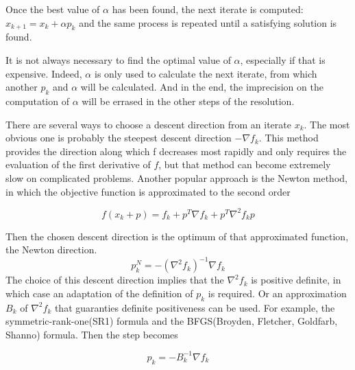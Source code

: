 Once the best value of $\alpha$ has been found, the next iterate is computed:
$x_{k+1} = x_{k} + \alpha p_k$ and the same process is repeated until a
satisfying solution is found. 

It is not always necessary to find the optimal value of $\alpha$, especially if
that is expensive. Indeed, $\alpha$ is only used to calculate the next iterate,
from which another $p_k$ and $\alpha$ will be calculated. And in the end, the
imprecision on the computation of $\alpha$ will be errased in the other steps of
the resolution.

There are several ways to choose a descent direction from an iterate $x_k$. The
most obvious one is probably the steepest descent direction $-\nabla f_k$. This
method provides the direction along which f decreases most rapidly and only
requires the evaluation of the first derivative of $f$, but that method can
become extremely slow on complicated problems. Another popular approach is the
Newton method, in which the objective function is approximated to the second
order

\begin{equation}
  f(x_k+p) = f_k + p^T\nabla f_k + p^T\nabla^2f_k p
\end{equation}

Then the chosen descent direction is the optimum of that approximated function,
the Newton direction.
\begin{equation}
  p^N_k = -(\nabla^2 f_k)^{-1} \nabla f_k
\end{equation}
The choice of this descent direction implies that the $\nabla^2f_k$ is positive
definite, in which case an adaptation of the definition of $p_k$ is required. Or
an approximation $B_k$ of $\nabla^2f_k$ that guaranties definite positiveness can be
used. For example, the symmetric-rank-one(SR1) formula and the BFGS(Broyden,
Fletcher, Goldfarb, Shanno) formula. Then the step becomes 

\begin{equation}
  p_k = -B_k^{-1}\nabla f_k
\end{equation}

